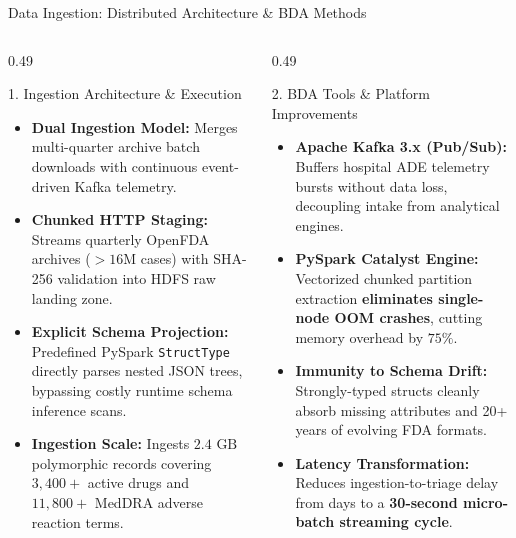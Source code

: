 \documentclass[11pt, aspectratio=169]{beamer}
\begin{document}
\begin{frame}{Data Ingestion: Distributed Architecture \& BDA Methods}
\footnotesize

\vspace{0.08cm}
\begin{columns}[T]
    \begin{column}{0.49\textwidth}
        \begin{block}{\footnotesize 1. Ingestion Architecture \& Execution}
            \begin{itemize}\scriptsize\setlength{\itemsep}{2.5pt}
                \item \textbf{Dual Ingestion Model:} Merges multi-quarter archive batch downloads with continuous event-driven Kafka telemetry.
                \item \textbf{Chunked HTTP Staging:} Streams quarterly OpenFDA archives ($>16\text{M}$ cases) with SHA-256 validation into HDFS raw landing zone.
                \item \textbf{Explicit Schema Projection:} Predefined PySpark \texttt{StructType} directly parses nested JSON trees, bypassing costly runtime schema inference scans.
                \item \textbf{Ingestion Scale:} Ingests $2.4\text{ GB}$ polymorphic records covering $3,400+$ active drugs and $11,800+$ MedDRA adverse reaction terms.
            \end{itemize}
        \end{block}
    \end{column}
    \begin{column}{0.49\textwidth}
        \begin{exampleblock}{\footnotesize 2. BDA Tools \& Platform Improvements}
            \begin{itemize}\scriptsize\setlength{\itemsep}{2.5pt}
                \item \textbf{Apache Kafka 3.x (Pub/Sub):} Buffers hospital ADE telemetry bursts without data loss, decoupling intake from analytical engines.
                \item \textbf{PySpark Catalyst Engine:} Vectorized chunked partition extraction \textbf{eliminates single-node OOM crashes}, cutting memory overhead by $75\%$.
                \item \textbf{Immunity to Schema Drift:} Strongly-typed structs cleanly absorb missing attributes and 20+ years of evolving FDA formats.
                \item \textbf{Latency Transformation:} Reduces ingestion-to-triage delay from days to a \textbf{30-second micro-batch streaming cycle}.
            \end{itemize}
        \end{exampleblock}
    \end{column}
\end{columns}
\end{frame}
\end{document}
